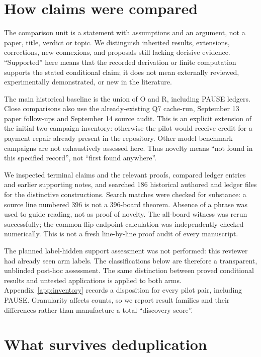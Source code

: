 \documentclass[11pt,a4paper]{article}
\begin{document}
\section{How claims were compared}
\label{sec:method}

The comparison unit is a statement with assumptions and an argument, not a
paper, title, verdict or topic. We distinguish inherited results, extensions,
corrections, new connexions, and proposals still lacking decisive evidence.
``Supported'' here means that the recorded derivation or finite computation
supports the stated conditional claim; it does not mean externally reviewed,
experimentally demonstrated, or new in the literature.

The main historical baseline is the union of O and R, including PAUSE ledgers.
Close comparisons also use the already-existing Q7 cache-run, September 13
paper follow-ups and September 14 source audit. This is an explicit extension
of the initial two-campaign inventory: otherwise the pilot would receive
credit for a payment repair already present in the repository. Other model
benchmark campaigns are not exhaustively assessed here. Thus novelty means
``not found in this specified record'', not ``first found anywhere''.

We inspected terminal claims and the relevant proofs, compared ledger
entries and earlier supporting notes, and searched 186 historical authored
and ledger files for the distinctive constructions. Search matches were
checked for substance: a source line numbered 396 is not a 396-board theorem.
Absence of a phrase was used to guide reading, not as proof of novelty.
The all-board witness was rerun successfully; the common-flip endpoint
calculation was independently checked numerically. This is not a fresh
line-by-line proof audit of every manuscript.

The planned label-hidden support assessment was not performed: this reviewer
had already seen arm labels. The classifications below are therefore a
transparent, unblinded post-hoc assessment. The same distinction between
proved conditional results and untested applications is applied to both arms.
Appendix~\ref{app:inventory} records a disposition for every pilot pair,
including PAUSE. Granularity affects counts, so we report result families
and their differences rather than manufacture a total ``discovery score''.

\section{What survives deduplication}
\end{document}
